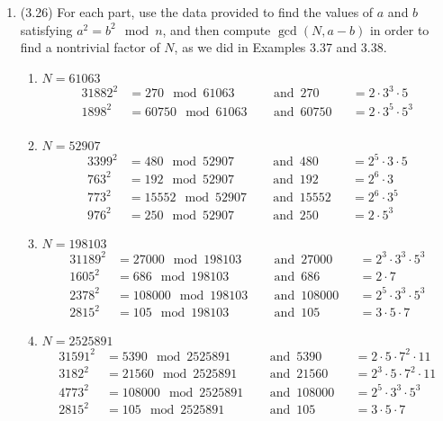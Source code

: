 \documentclass[12pt]{amsart}
\theoremstyle{definition}
\begin{document}
\begin{enumerate}
	\item (3.26) For each part, use the data provided to find the 
		values of $a$ and $b$ satisfying $a^2 = b^2 \mod n$, and 
		then compute $\operatorname{gcd}(N,a-b)$ in order to 
		find a nontrivial factor of $N$, as we did in Examples 
		3.37 and 3.38.
	\begin{enumerate}
		\item $N = 61063$ 
		\begin{alignat*}{3}
			1882^2 & = 270 \mod 61063~ && \operatorname{and}~
			270 && = 2 \cdot 3^3 \cdot 5 \\
			1898^2 & = 60750 \mod 61063~ && \operatorname{and}~ 
			60750 && = 2 \cdot 3^5 \cdot 5^3  \\
		\end{alignat*}
		\item $N = 52907$
		\begin{alignat*}{3}
			399^2 & = 480 \mod 52907~ && \operatorname{and}~
			480 && = 2^5 \cdot 3 \cdot 5 \\
			763^2 & = 192 \mod 52907~ && \operatorname{and}~
			192 && = 2^6 \cdot 3 \\ 
			773^2 & = 15552 \mod 52907~ && \operatorname{and}~
			15552 && = 2^6 \cdot 3^5 \\
			976^2 & = 250 \mod 52907~ && \operatorname{and}~
			250 && = 2 \cdot 5^3 
		\end{alignat*}
		\item $N = 198103$
		\begin{alignat*}{3}
			1189^2 & = 27000 \mod 198103~ && \operatorname{and}~
			27000 && = 2^3 \cdot 3^3 \cdot 5^3 \\
			1605^2 & = 686 \mod 198103~ && \operatorname{and}~
			686 && = 2 \cdot 7 \\ 
			2378^2 & = 108000 \mod 198103~ && \operatorname{and}~
			108000 && = 2^5 \cdot 3^3 \cdot 5^3 \\
			2815^2 & = 105 \mod 198103~ && \operatorname{and}~
			105 && = 3 \cdot 5 \cdot 7
		\end{alignat*}
		\item $N = 2525891$
		\begin{alignat*}{3}
			1591^2 & = 5390 \mod 2525891~ && \operatorname{and}~
			5390 && = 2 \cdot 5 \cdot 7^2 \cdot 11 \\
			3182^2 & = 21560 \mod 2525891~ && \operatorname{and}~
			21560 && = 2^3 \cdot 5 \cdot 7^2 \cdot 11 \\ 
			4773^2 & = 108000 \mod 2525891~ && \operatorname{and}~
			108000 && = 2^5 \cdot 3^3 \cdot 5^3 \\
			2815^2 & = 105 \mod 2525891~ && \operatorname{and}~
			105 && = 3 \cdot 5 \cdot 7
		\end{alignat*}
			

\end{enumerate}
\end{enumerate}
\end{document}

